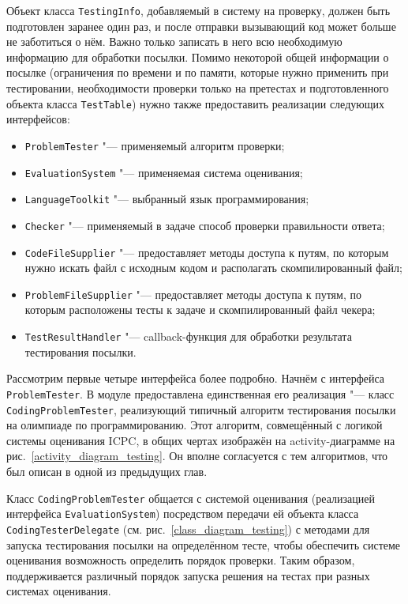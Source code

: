 Объект класса \texttt{Testing\-Info}, добавляемый в систему на проверку, должен быть подготовлен заранее один раз, и после отправки вызывающий код может больше не заботиться о нём. Важно только записать в него всю необходимую информацию для обработки посылки. Помимо некоторой общей информации о посылке (ограничения по времени и по памяти, которые нужно применить при тестировании, необходимости проверки только на претестах и подготовленного объекта класса \texttt{Test\-Table}) нужно также предоставить реализации следующих интерфейсов:

\begin{itemize}
\item \texttt{ProblemTester} "--- применяемый алгоритм проверки;
\item \texttt{EvaluationSystem} "--- применяемая система оценивания;
\item \texttt{LanguageToolkit} "--- выбранный язык программирования;
\item \texttt{Checker} "--- применяемый в задаче способ проверки правильности ответа;
\item \texttt{CodeFileSupplier} "--- предоставляет методы доступа к путям, по которым нужно искать файл с исходным кодом и располагать скомпилированный файл;
\item \texttt{ProblemFileSupplier} "--- предоставляет методы доступа к путям, по которым расположены тесты к задаче и скомпилированный файл чекера;
\item \texttt{TestResultHandler} "--- callback-функция для обработки результата тестирования посылки.
\end{itemize}

Рассмотрим первые четыре интерфейса более подробно. Начнём с интерфейса \texttt{Problem\-Tester}. В модуле предоставлена единственная его реализация "--- класс \texttt{Coding\-Problem\-Tester}, реализующий типичный алгоритм тестирования посылки на олимпиаде по программированию. Этот алгоритм, совмещённый с логикой системы оценивания ICPC, в общих чертах изображён на activity-диаграмме на рис.~\ref{activity_diagram_testing}. Он вполне согласуется с тем алгоритмов, что был описан в одной из предыдущих глав.

Класс \texttt{Coding\-Problem\-Tester} общается с системой оценивания (реализацией интерфейса \texttt{Evaluation\-System}) посредством передачи ей объекта класса \texttt{Coding\-Tester\-Delegate} (см. рис.~\ref{class_diagram_testing}) с методами для запуска тестирования посылки на определённом тесте, чтобы обеспечить системе оценивания возможность определить порядок проверки. Таким образом, поддерживается различный порядок запуска решения на тестах при разных системах оценивания.

